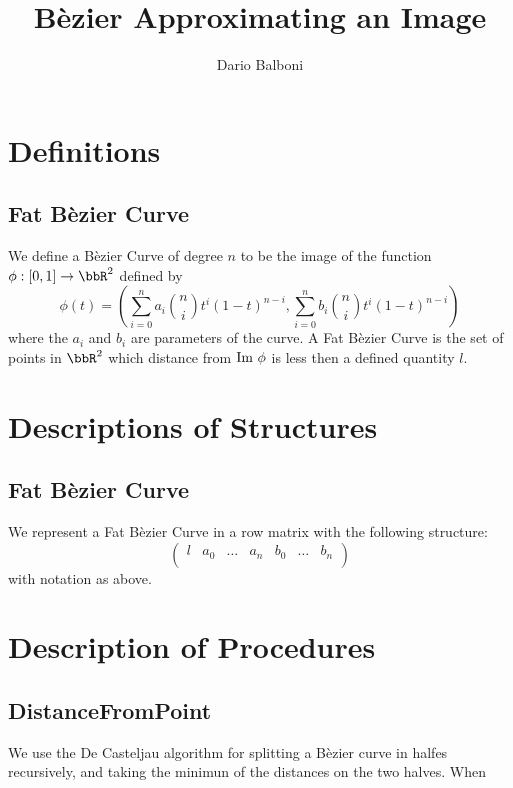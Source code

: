 \documentclass[a4paper,NoNotes,GeneralMath]{stdmdoc}
\begin{document}
	\title{Bèzier Approximating an Image}
	\author{Dario Balboni}	
	\autodate

	\section*{Definitions}
	\subsection*{Fat Bèzier Curve}
	We define a Bèzier Curve of degree $n$ to be the image of the function $\phi: [0, 1] \rar \bbR^2$ defined by
	$$ \phi(t) = (\sum_{i=0}^n a_i \binom{n}{i} t^i (1-t)^{n-i},  \sum_{i=0}^n b_i \binom{n}{i} t^i (1-t)^{n-i}) $$
	where the $a_i$ and $b_i$ are parameters of the curve. A Fat Bèzier Curve is the set of points in $\bbR^2$ which
	distance from $\mbox{Im } \phi$ is less then a defined quantity $l$.

	\section*{Descriptions of Structures}
	\subsection*{Fat Bèzier Curve}
	We represent a Fat Bèzier Curve in a row matrix with the following structure:
	$$ \left( \begin{array}{ccccccc} l & a_0 & \ldots & a_n & b_0 & \ldots & b_n \\ \end{array} \right) $$
	with notation as above.

	\section*{Description of Procedures}
	\subsection*{DistanceFromPoint}
	We use the De Casteljau algorithm for splitting a Bèzier curve in halfes recursively, and taking the minimun of the
	distances on the two halves. When 
\end{document}
